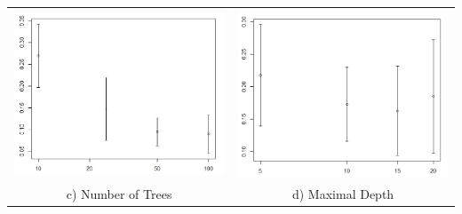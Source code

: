 \documentclass[11pt]{article}
\begin{document}
\begin{table}[H]
\begin{tabular}{c c}
\begin{minipage}{.45\textwidth}
			\centering
			\includegraphics[width=0.99\textwidth]{nt}
		\end{minipage} 
		&
		\begin{minipage}{.45\textwidth}
			\centering
			\includegraphics[width=0.99\textwidth]{md}
		\end{minipage} \\
		c) Number of Trees & d) Maximal Depth
	\end{tabular} \hfill
	\label{res}
\end{table}
\end{document}
